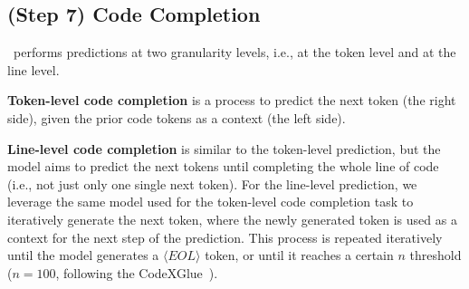 


\subsection{(Step 7) Code Completion}
\our~performs predictions at two granularity levels, i.e., at the token level and at the line level.

\textbf{Token-level code completion} is a process to predict the next token (the right side), given the prior code tokens as a context (the left side).

\textbf{Line-level code completion} is similar to the token-level prediction, but the model aims to predict the next tokens until completing the whole line of code (i.e., not just only one single next token).
For the line-level prediction, we leverage the same model used for the token-level code completion task to iteratively generate the next token, where the newly generated token is used as a context for the next step of the prediction.
This process is repeated iteratively until the model generates a $\langle EOL \rangle$ token, or until it reaches a certain $n$ threshold ($n=100$, following the CodeXGlue~\cite{lu2021codexglue}).








